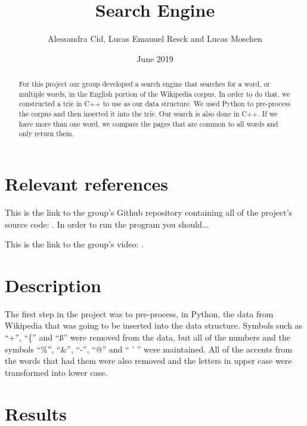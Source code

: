 \documentclass{article}
\title{Search Engine}
\author{Alessandra Cid, Lucas Emanuel Resck  
and Lucas Moschen}
\date{June 2019}
\begin{document}
\maketitle

\begin{abstract}
For this project our group developed a search engine that searches for a word, or multiple words, in the English portion of the Wikipedia corpus. In order to do that, we constructed a trie in C++ to use as our data structure. We used Python to pre-process the corpus and then inserted it into the trie. Our search is also done in C++. If we have more than one word, we compare the pages that are common to all words and only return them. 
\end{abstract}

\section*{Relevant references}
This is the link to the group's Github repository containing all of the project's 
source code: . In order to run the program you should...

This is the link to the group's video: . 

\section*{Description}
The first step in the project was to pre-process, in Python, the data from Wikipedia that was going to be inserted into the data structure.  Symbols such as ``+'', ``\{'' and ``ß'' were removed from the data, but all of the numbers and the symbols ``\%'', ``\&'', ``-'', ``@'' and `` ' '' were maintained. All of the accents from the words that had them were also removed and the letters in upper case were transformed into lower case. 

\section*{Results}
\end{document}
